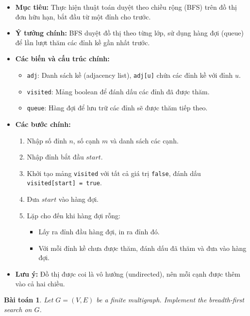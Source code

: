 \documentclass{article}
\newtheorem{baitoan}{Bài toán}
\begin{document}
\begin{itemize}
    \item \textbf{Mục tiêu:} Thực hiện thuật toán duyệt theo chiều rộng (BFS) trên đồ thị đơn hữu hạn, bắt đầu từ một đỉnh cho trước.
    \item \textbf{Ý tưởng chính:} BFS duyệt đồ thị theo từng lớp, sử dụng hàng đợi (queue) để lần lượt thăm các đỉnh kề gần nhất trước.
    \item \textbf{Các biến và cấu trúc chính:}
    \begin{itemize}
        \item \texttt{adj}: Danh sách kề (adjacency list), \texttt{adj[u]} chứa các đỉnh kề với đỉnh $u$.
        \item \texttt{visited}: Mảng boolean để đánh dấu các đỉnh đã được thăm.
        \item \texttt{queue}: Hàng đợi để lưu trữ các đỉnh sẽ được thăm tiếp theo.
    \end{itemize}
    \item \textbf{Các bước chính:}
    \begin{enumerate}
        \item Nhập số đỉnh $n$, số cạnh $m$ và danh sách các cạnh.
        \item Nhập đỉnh bắt đầu $start$.
        \item Khởi tạo mảng \texttt{visited} với tất cả giá trị \texttt{false}, đánh dấu \texttt{visited[start] = true}.
        \item Đưa $start$ vào hàng đợi.
        \item Lặp cho đến khi hàng đợi rỗng:
        \begin{itemize}
            \item Lấy ra đỉnh đầu hàng đợi, in ra đỉnh đó.
            \item Với mỗi đỉnh kề chưa được thăm, đánh dấu đã thăm và đưa vào hàng đợi.
        \end{itemize}
    \end{enumerate}
    \item \textbf{Lưu ý:} Đồ thị được coi là vô hướng (undirected), nên mỗi cạnh được thêm vào cả hai chiều.
\end{itemize}

\begin{baitoan}
    Let $G = (V,E)$ be a finite multigraph. Implement the breadth-first search on $G$.
\end{baitoan}

\end{document}
